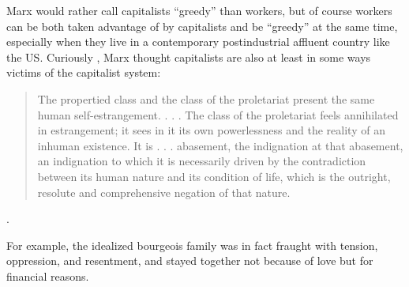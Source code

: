 \documentclass[10pt, letterpaper]{article}
\begin{document}
\begin{spacing}{1.8}
Marx would rather call capitalists ``greedy'' than workers, but of course workers can be both taken advantage of by capitalists and be ``greedy'' at the same time, especially when they live in a contemporary postindustrial affluent country like the US.
Curiously , Marx thought capitalists are also at least in some ways victims of the capitalist system:
\begin{quote}
  The propertied class and the class of the proletariat present the same human
  self-estrangement. . . . The class of the proletariat feels annihilated in
  estrangement; it sees in it its own powerlessness and the reality of an
  inhuman existence. It is . . . abasement, the indignation at that abasement,
  an indignation to which it is necessarily driven by the contradiction between
  its human nature and its condition of life, which is the outright, resolute
  and comprehensive negation of that nature.
\end{quote} \citep[cited in][p 381]{byron16}.

For example, the idealized bourgeois family was in fact fraught with tension, oppression, and resentment, and stayed together not because of love but for financial reasons.


\end{spacing}
\end{document}
